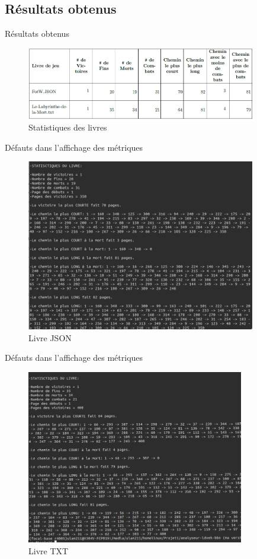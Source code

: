 \documentclass[aspectratio=169,xcolor=dvipsnames]{beamer}
\begin{document}
\subsection{Résultats obtenus}
\begin{frame}{Résultats obtenus}
\begin{figure}
\centering
  \includegraphics[width=100mm,scale=0.5]{stats.png}
  \caption{Statistiques des livres}
\end{figure}
\end{frame}

\begin{frame}{Défauts dans l'affichage des métriques}
\begin{figure}
\centering
  \includegraphics[width=100mm,scale=0.5]{livreJSON.png}
  \caption{Livre JSON}
\end{figure}
\end{frame}

\begin{frame}{Défauts dans l'affichage des métriques}
\begin{figure}
\centering
    \includegraphics[width=95mm,scale=0.5]{livreTXT.png}
  \caption{Livre TXT}
\end{figure}
\end{frame}
\end{document}
